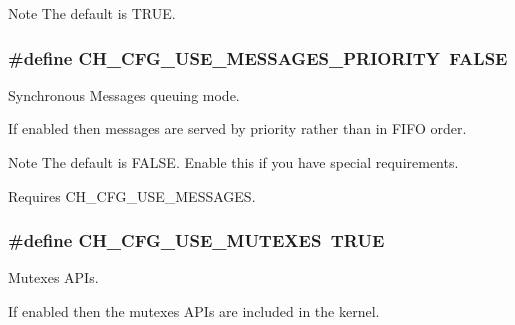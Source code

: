 \begin{DoxyNote}{Note}
The default is {\ttfamily T\+R\+U\+E}. 
\end{DoxyNote}
\hypertarget{group__config_gaa65eccee8e56f16bccf3709c23f7ac57}{
\subsubsection[{C\+H\+\_\+\+C\+F\+G\+\_\+\+U\+S\+E\+\_\+\+M\+E\+S\+S\+A\+G\+E\+S\+\_\+\+P\+R\+I\+O\+R\+I\+T\+Y}]{\setlength{\rightskip}{0pt plus 5cm}\#define C\+H\+\_\+\+C\+F\+G\+\_\+\+U\+S\+E\+\_\+\+M\+E\+S\+S\+A\+G\+E\+S\+\_\+\+P\+R\+I\+O\+R\+I\+T\+Y~F\+A\+L\+S\+E}}\label{group__config_gaa65eccee8e56f16bccf3709c23f7ac57}


Synchronous Messages queuing mode. 

If enabled then messages are served by priority rather than in F\+I\+F\+O order.

\begin{DoxyNote}{Note}
The default is {\ttfamily F\+A\+L\+S\+E}. Enable this if you have special requirements. 

Requires {\ttfamily C\+H\+\_\+\+C\+F\+G\+\_\+\+U\+S\+E\+\_\+\+M\+E\+S\+S\+A\+G\+E\+S}. 
\end{DoxyNote}
\hypertarget{group__config_ga7263b362a62e34158d09b44b4c204c27}{
\subsubsection[{C\+H\+\_\+\+C\+F\+G\+\_\+\+U\+S\+E\+\_\+\+M\+U\+T\+E\+X\+E\+S}]{\setlength{\rightskip}{0pt plus 5cm}\#define C\+H\+\_\+\+C\+F\+G\+\_\+\+U\+S\+E\+\_\+\+M\+U\+T\+E\+X\+E\+S~T\+R\+U\+E}}\label{group__config_ga7263b362a62e34158d09b44b4c204c27}


Mutexes A\+P\+Is. 

If enabled then the mutexes A\+P\+Is are included in the kernel.

